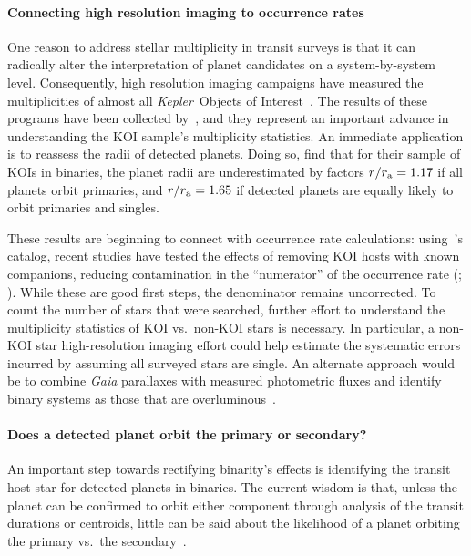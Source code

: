 \documentclass[12pt,modern]{aastex61}
\renewcommand{\a}{_{\rm a}}
\begin{document}
\paragraph{Connecting high resolution imaging to occurrence rates}
One reason to address stellar multiplicity in transit surveys is that
it can radically alter the interpretation of planet candidates on a
system-by-system level.  Consequently, high resolution imaging
campaigns have measured the multiplicities of almost all {\it Kepler}\
Objects of Interest~\citep{
  howell_speckle_2011,adams_adaptive_2012,adams_adaptive_2013,horch_observations_2012,
  horch_most_2014,lillo-box_multiplicity_2012,lillo-box_high-resolution_2014,dressing_adaptive_2014,
  law_robotic_2014,cartier_revision_2015,everett_high-resolution_2015,gilliland_hubble_2015,
  wang_influence_2015,wang_influence_2015-1,baranec_robo-ao_2016,ziegler_robo-ao_2017}.
The results of these programs have been collected
by~\citet{furlan_kepler_2017}, and they represent an important advance
in understanding the KOI sample's multiplicity statistics.  
An immediate application is to reassess the radii of detected planets.
Doing so, \citet{hirsch_assessing_2017} find that for their sample of KOIs
in binaries, the planet radii are underestimated by factors $r/r\a = 1.17$
if all planets orbit primaries, and $r/r\a = 1.65$ if detected
planets are equally likely to orbit primaries and singles.

These results are beginning to connect with
occurrence rate calculations: using~\citet{furlan_kepler_2017}'s
catalog, recent studies have tested the effects of removing KOI hosts with
known companions, reducing contamination in the ``numerator'' of the
occurrence rate (\citealt{fulton_california-_2017};
\citealt{petigura_CKS_2017}).  
While these are good first steps, the
denominator remains uncorrected.  To count the number of stars that
were searched, further effort to understand the multiplicity
statistics of KOI vs.~non-KOI stars is necessary. In particular,
a non-KOI star high-resolution imaging effort could help estimate
the systematic errors incurred by assuming all surveyed stars are
single.
An alternate approach would be to combine {\it Gaia}
parallaxes with measured photometric fluxes and identify binary systems
as those that are 
overluminous~\citep[\textit{e.g.},][]{widmark_inferring_2018}.

\paragraph{Does a detected planet orbit the primary or secondary?}
An important step towards rectifying binarity's effects is
identifying the transit host star for detected planets in binaries.
The current wisdom is that, unless the planet can be confirmed to
orbit either component through analysis of the transit durations or
centroids, little can be said about the likelihood of a
planet orbiting the primary vs.~the
secondary~\citep[\textit{e.g.},][though~\citealt{hirsch_assessing_2017}'s 
do weight radius corrections by planet 
occurrence]{ciardi_understanding_2015,ziegler_robo-ao_2017}.
\end{document}
